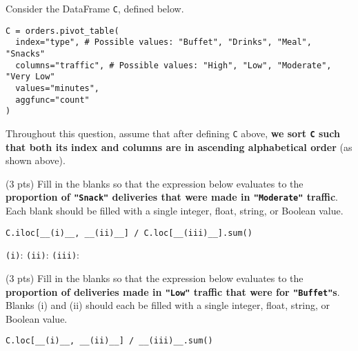 \documentclass[twoside,12pt]{article}
\begin{document}
\begin{probset}
\begin{prob}[(3 pts)]
\begin{responsebox}{2in}
\end{responsebox}

\end{prob}

\newpage

\begin{prob}[(6 pts)]

Consider the DataFrame \texttt{C}, defined below.

\begin{verbatim}
C = orders.pivot_table(
  index="type", # Possible values: "Buffet", "Drinks", "Meal", "Snacks"
  columns="traffic", # Possible values: "High", "Low", "Moderate", "Very Low"
  values="minutes",
  aggfunc="count"
)
\end{verbatim}

Throughout this question, assume that after defining \texttt{C} above, \textbf{we sort \texttt{C} such that both its index and columns are in ascending alphabetical order} (as shown above).

\begin{subprobset}

\begin{subprob}(3 pts) Fill in the blanks so that the expression below evaluates to the \textbf{proportion of \texttt{"Snack"} deliveries that were made in \texttt{"Moderate"} traffic}. Each blank should be filled with a single integer, float, string, or Boolean value.

\begin{verbatim}
C.iloc[__(i)__, __(ii)__] / C.loc[__(iii)__].sum()
\end{verbatim}

\texttt{(i)}: \inlineresponsebox[1.5in]{} \texttt{(ii)}: \inlineresponsebox[1.5in]{} \texttt{(iii)}: \inlineresponsebox[1.5in]{}

\end{subprob}

\vspace{0.2in}

\begin{subprob}(3 pts) Fill in the blanks so that the expression below evaluates to the \textbf{proportion of deliveries made in \texttt{"Low"} traffic that were for \texttt{"Buffet"}s}. Blanks (i) and (ii) should each be filled with a single integer, float, string, or Boolean value.

\begin{verbatim}
C.loc[__(i)__, __(ii)__] / __(iii)__.sum()
\end{verbatim}


\end{subprob}
\end{subprobset}
\end{prob}
\end{probset}
\end{document}
